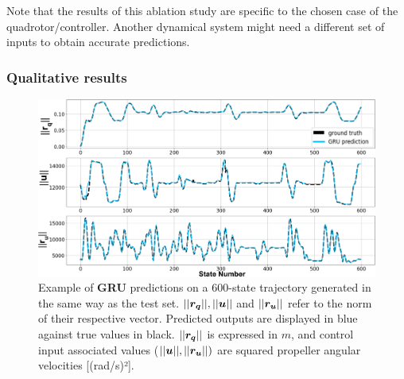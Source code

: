 Note that the results of this ablation study are specific to the chosen case of the quadrotor/controller.
Another dynamical system might need a different set of inputs to obtain accurate predictions.

\subsubsection{Qualitative results}

\begin{figure}[t]
    \centering
    \includegraphics[width=0.99\linewidth]{figures/learning_quadrotor/long_pred.png}
    \caption{Example of \textbf{GRU} predictions on a 600-state trajectory generated in the same way as the test set. $||\boldsymbol{r_q}||, ||\boldsymbol{u}||$ and $||\boldsymbol{r_u}||$ refer to the norm of their respective vector. Predicted outputs are displayed in blue against true values in black. $||\boldsymbol{r_q}||$ is expressed in $m$, and control input associated values ($||\boldsymbol{u}||,||\boldsymbol{r_u}||)$ are squared propeller angular velocities [(rad/s)²].}
    \label{fig:long_test}
\end{figure}

